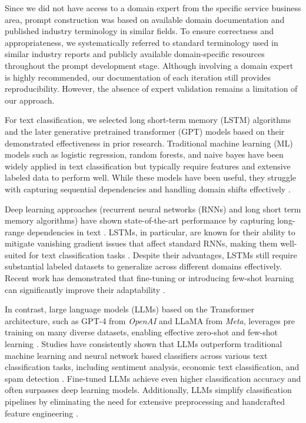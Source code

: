 Since we did not have access to a domain expert from the specific service business area, prompt construction was based on available domain documentation and published industry terminology in similar fields. To ensure correctness and appropriateness, we systematically referred to standard terminology used in similar industry reports and publicly available domain-specific resources throughout the prompt development stage. Although involving a domain expert is highly recommended, our documentation of each iteration still provides reproducibility. However, the absence of expert validation remains a limitation of our approach.

%
%
For text classification, we selected long short-term memory (LSTM) algorithms and the later generative pretrained transformer (GPT) models based on their demonstrated effectiveness in prior research. Traditional machine learning (ML) models such as logistic regression, random forests, and naive bayes have been widely applied in text classification but typically require features and extensive labeled data to perform well. While these models have been useful, they struggle with capturing sequential dependencies and handling domain shifts effectively \cite{sarker2021machine}.

Deep learning approaches (recurrent neural networks (RNNs) and long short term memory algorithms) have shown state-of-the-art performance by capturing long-range dependencies in text \cite{sutskever2014sequence}. LSTMs, in particular, are known for their ability to mitigate vanishing gradient issues that affect standard RNNs, making them well-suited for text classification tasks \cite{hochreiter1997long}. Despite their advantages, LSTMs still require substantial labeled datasets to generalize across different domains effectively. Recent work has demonstrated that fine-tuning or introducing few-shot learning can significantly improve their adaptability \cite{jamshidi2024effective}.

In contrast, large language models (LLMs) based on the Transformer architecture, such as GPT-4 from \textit{OpenAI} and LLaMA from \textit{Meta}, leverages pre training on many diverse datasets, enabling effective zero-shot and few-shot learning \cite{brown2020language, touvron2023llama}. Studies have consistently shown that LLMs outperform traditional machine learning and neural network based classifiers across various text classification tasks, including sentiment analysis, economic text classification, and spam detection \cite{moller2024parrot, betianu2024dallmi}. Fine-tuned LLMs achieve even higher classification accuracy and often surpasses deep learning models. Additionally, LLMs simplify classification pipelines by eliminating the need for extensive preprocessing and handcrafted feature engineering \cite{oh2024language}.

